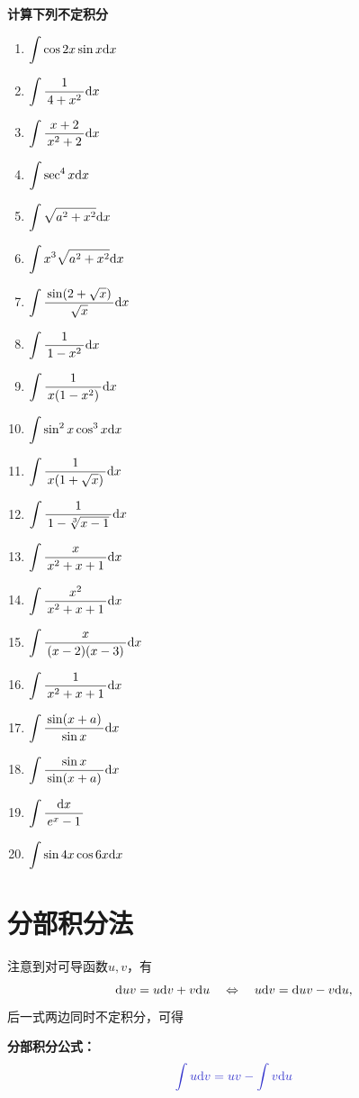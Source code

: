 \begin{ext}
	{\bf 计算下列不定积分}
	
	\begin{enumerate}
	  \item $\dint\cos2x\sin x\d x$
	  \item $\dint\df1{4+x^2}\d x$
	  \item $\dint\df{x+2}{x^2+2}\d x$
	  \item $\dint\sec^4x\d x$
	  \item $\dint\sqrt{a^2+x^2}\d x$
	  \item $\dint x^3\sqrt{a^2+x^2}\d x$
	  \item $\dint\df{\sin(2+\sqrt x)}{\sqrt x}\d x$
	  \item $\dint\df1{1-x^2}\d x$
	  \item $\dint\df1{x(1-x^2)}\d x$
	  \item $\dint\sin^2x\cos^3x\d x$
	  \item $\dint\df1{x(1+\sqrt x)}\d x$
	  \item $\dint\df1{1-\sqrt[3]{x-1}}\d x$
	  \item $\dint\df{x}{x^2+x+1}\d x$
	  \item $\dint\df{x^2}{x^2+x+1}\d x$
	  \item $\dint\df{x}{(x-2)(x-3)}\d x$
	  \item $\dint\df1{x^2+x+1}\d x$
	  \item $\dint\df{\sin(x+a)}{\sin x}\d x$
	  \item $\dint\df{\sin x}{\sin(x+a)}\d x$
	  \item $\dint\df{\d x}{e^x-1}$
	  \item $\dint\sin4x\cos6x\d x$
	\end{enumerate}
\end{ext}

\section{分部积分法}

注意到对可导函数$u,v$，有
$$\d uv=u\d v+v\d u\quad\Leftrightarrow\quad 
u\d v=\d uv-v\d u,$$
后一式两边同时不定积分，可得
\begin{thx}
	{\bf 分部积分公式：}
	$${\b \dint u\d v=uv-\dint v\d u}$$
\end{thx}

